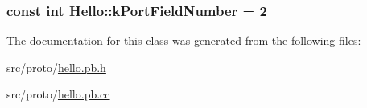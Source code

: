 \subsubsection[{\texorpdfstring{k\+Port\+Field\+Number}{kPortFieldNumber}}]{\setlength{\rightskip}{0pt plus 5cm}const int Hello\+::k\+Port\+Field\+Number = 2\hspace{0.3cm}{\ttfamily [static]}}\hypertarget{class_hello_a3a791c34e509d6daa9c887afb1311a6d}{}\label{class_hello_a3a791c34e509d6daa9c887afb1311a6d}


The documentation for this class was generated from the following files\+:\begin{DoxyCompactItemize}
\item 
src/proto/\hyperlink{hello_8pb_8h}{hello.\+pb.\+h}\item 
src/proto/\hyperlink{hello_8pb_8cc}{hello.\+pb.\+cc}\end{DoxyCompactItemize}
